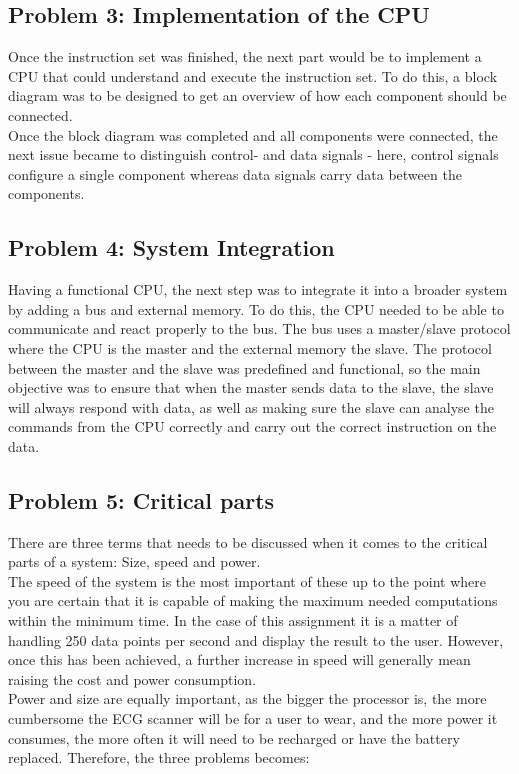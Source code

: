 \documentclass[12pt,a4paper]{article}
\begin{document}
\subsection{Problem 3: Implementation of the CPU}
	Once the instruction set was finished, the next part would be to implement a CPU that could understand and execute the instruction set. To do this, a block diagram was to be designed to get an overview of how each component should be connected.\\
	Once the block diagram was completed and all components were connected, the next issue became to distinguish control- and data signals - here, control signals configure a single component whereas data signals carry data between the components.\\
	
\subsection{Problem 4: System Integration}
	Having a functional CPU, the next step was to integrate it into a broader system by adding a bus and external memory. To do this, the CPU needed to be able to communicate and react properly to the bus. The bus uses a master/slave protocol where the CPU is the master and the external memory the slave. The protocol between the master and the slave was predefined and functional, 
	so the main objective was to ensure that when the master sends data to the slave, the slave will always respond with data, as well as making sure the slave can analyse the commands from the CPU correctly and carry out the correct instruction on the data.\\
	
\subsection{Problem 5: Critical parts}
	There are three terms that needs to be discussed when it comes to the critical parts of a system: Size, speed and power.\\
	The speed of the system is the most important of these up to the point where you are certain that it is capable of making the maximum needed computations within the minimum time. In the case of this assignment it is a matter of handling 250 data points per second and display the result to the user. However, once this has been achieved, a further increase in speed will generally mean raising the cost and power consumption.\\
	Power and size are equally important, as the bigger the processor is, the more cumbersome the ECG scanner will be for a user to wear, and the more power it consumes, the more often it will need to be recharged or have the battery replaced. Therefore, the three problems becomes:
	
\end{document}
